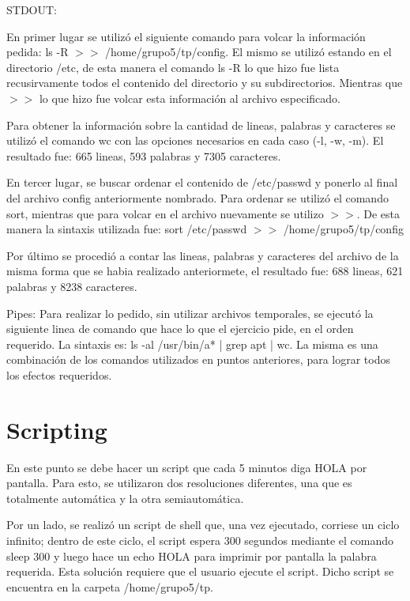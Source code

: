 \documentclass[a4paper, 12pt]{article}
\begin{document}
STDOUT:

En primer lugar se utiliz\'o el siguiente comando para volcar la informaci\'on pedida: ls -R $>>$ /home/grupo5/tp/config. El mismo se utiliz\'o estando en el directorio /etc, de esta manera el comando ls -R lo que hizo fue lista recusirvamente todos el contenido del directorio y su subdirectorios. Mientras que $>>$ lo que hizo fue volcar esta informaci\'on al archivo especificado.

Para obtener la informaci\'on sobre la cantidad de lineas, palabras y caracteres se utiliz\'o el comando wc con las opciones necesarios en cada caso (-l, -w, -m). El resultado fue: 665 lineas, 593 palabras y 7305 caracteres.

En tercer lugar, se buscar ordenar el contenido de /etc/passwd y ponerlo al final del archivo config anteriormente nombrado. Para ordenar se utiliz\'o el comando sort, mientras que para volcar en el archivo nuevamente se utilizo $>>$. De esta manera la sintaxis utilizada fue: sort /etc/passwd $>>$ /home/grupo5/tp/config

Por \'ultimo se procedi\'o a contar las lineas, palabras y caracteres del archivo de la misma forma que se habia realizado anteriormete, el resultado fue: 688 lineas, 621 palabras y 8238 caracteres.

\medskip


Pipes: Para realizar lo pedido, sin utilizar archivos temporales, se ejecut\'o la siguiente linea de comando que hace lo que el ejercicio pide, en el orden requerido. La sintaxis es: ls -al /usr/bin/a* | grep apt | wc. La misma es una combinaci\'on de los comandos utilizados en puntos anteriores, para lograr todos los efectos requeridos.



\section*{Scripting}

En este punto se debe hacer un script que cada 5 minutos diga HOLA por pantalla. Para esto, se utilizaron dos resoluciones diferentes, una que es totalmente autom\'atica y la otra semiautom\'atica. 

Por un lado, se realiz\'o un script de shell que, una vez ejecutado, corriese un ciclo infinito; dentro de este ciclo, el script espera 300 segundos mediante el comando sleep 300 y luego hace un echo HOLA para imprimir por pantalla la palabra requerida. Esta soluci\'on requiere que el usuario ejecute el script. Dicho script se encuentra en la carpeta /home/grupo5/tp.
\end{document}
